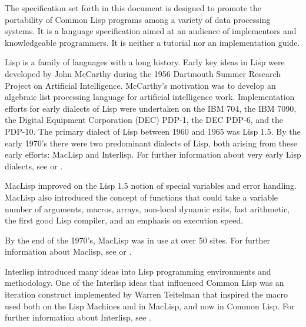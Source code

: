 
  

The specification set forth in this document is designed to promote the portability of Common Lisp programs among a variety of data processing systems. It is a language specification aimed at an audience of implementors and knowledgeable programmers. It is neither a tutorial nor an implementation guide. 
\endsubSection%

Lisp is a family of languages with a long history.  Early key ideas in Lisp were developed by John McCarthy during the 1956 Dartmouth Summer Research Project on Artificial Intelligence.  McCarthy's motivation was to develop an algebraic list processing language for artificial intelligence work. Implementation efforts for early dialects of Lisp were undertaken on the IBM 704, the IBM 7090, the Digital Equipment Corporation (DEC) PDP-1, the DEC PDP-6, and the PDP-10. The primary dialect of Lisp between 1960 and 1965 was Lisp 1.5. By the early 1970's there were two predominant dialects of Lisp, both arising from these early efforts: MacLisp and Interlisp. For further information about very early Lisp dialects, see {\AnatomyOfLisp} or {\LispOnePointFive}.

MacLisp improved on the Lisp 1.5 notion of special variables and error handling. MacLisp also introduced the concept of functions that could take a variable number of arguments, macros, arrays, non-local dynamic exits, fast arithmetic, the first good Lisp compiler, and an emphasis on execution speed. 

By the end of the 1970's, MacLisp was in use at over 50 sites. For further information about Maclisp, see {\Moonual} or {\Pitmanual}.
  
Interlisp introduced many ideas into Lisp programming environments and methodology. One of the Interlisp ideas that influenced Common Lisp was an iteration construct implemented by Warren Teitelman that inspired the  macro used both on the Lisp Machines and in MacLisp, and now in Common Lisp. For further information about Interlisp, see {\InterlispManual}.

